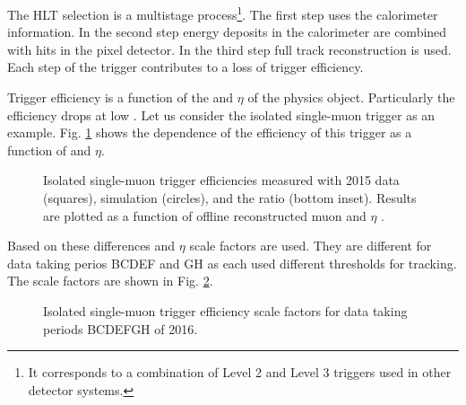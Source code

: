 \begin{description}
The HLT selection is a multistage process\footnote{It corresponds to a combination of Level 2 and Level 3 triggers used in other detector systems.}. The first step uses the calorimeter information. In the second step energy deposits in the calorimeter are combined with hits in the pixel detector. In the third step full track reconstruction is used. Each step of the trigger contributes to a loss of trigger efficiency.

Trigger efficiency is a function of the \pt and $\eta$ of the physics object. Particularly the efficiency drops at low \pt. Let us consider the isolated single-muon trigger as an example. Fig. \ref{fig:CMS-MUO-16-001_Figure_008} shows the dependence of the efficiency of this trigger as a function of \pt and $\eta$.

\begin{figure}[htp]
\centering
  \def\twidth{0.45}
  \centering
  \hfil
\caption{Isolated single-muon trigger efficiencies measured with 2015 data (squares), simulation (circles), and the ratio (bottom inset). Results are plotted as a function of offline reconstructed muon \pt and $\eta$ \cite{Sirunyan:2018fpa}.}
\label{fig:CMS-MUO-16-001_Figure_008}
\end{figure}

Based on these differences \pt and $\eta$ scale factors are used. They are different for data taking perios BCDEF and GH as each used different thresholds for tracking. The scale factors are shown in Fig. \ref{fig:muontriggerssf}.

\begin{figure}[htp]
\centering
  \def\twidth{0.45}
  \centering
  \hfil
\caption{Isolated single-muon trigger efficiency scale factors for data taking periods BCDEFGH of 2016.}
\label{fig:muontriggerssf}
\end{figure}


\end{description}
